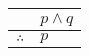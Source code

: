 \documentclass{standalone}
\begin{document}
\begin{tabular}{rl}
    & $p \land q$ \\
    \hline
    $\therefore$ & $p$
\end{tabular}
\end{document}
